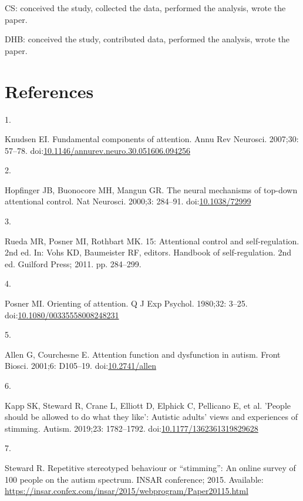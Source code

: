 \documentclass[
  letterpaper,
  DIV=11,
  numbers=noendperiod]{scrartcl}
\newlength{\cslhangindent}
\newlength{\csllabelwidth}
\newenvironment{CSLReferences}[2] %
 {\begin{list}{}{%
  \setlength{\itemindent}{0pt}
  \setlength{\leftmargin}{0pt}
  \setlength{\parsep}{0pt}
  \ifodd #1
   \setlength{\leftmargin}{\cslhangindent}
   \setlength{\itemindent}{-1\cslhangindent}
  \fi
  \setlength{\itemsep}{#2\baselineskip}}}
 {\end{list}}
\newcommand{\CSLLeftMargin}[1]{\parbox[t]{\csllabelwidth}{\strut#1\strut}}
\newcommand{\CSLRightInline}[1]{\parbox[t]{\linewidth - \csllabelwidth}{\strut#1\strut}}
\begin{document}
CS: conceived the study, collected the data, performed the analysis,
wrote the paper.

DHB: conceived the study, contributed data, performed the analysis,
wrote the paper.

\section*{References}\label{references}

\label{refs}
\begin{CSLReferences}{0}{1}
\CSLLeftMargin{1. }%
\CSLRightInline{Knudsen EI. Fundamental components of attention. Annu
Rev Neurosci. 2007;30: 57--78.
doi:\href{https://doi.org/10.1146/annurev.neuro.30.051606.094256}{10.1146/annurev.neuro.30.051606.094256}}

\CSLLeftMargin{2. }%
\CSLRightInline{Hopfinger JB, Buonocore MH, Mangun GR. The neural
mechanisms of top-down attentional control. Nat Neurosci. 2000;3:
284--91. doi:\href{https://doi.org/10.1038/72999}{10.1038/72999}}

\CSLLeftMargin{3. }%
\CSLRightInline{Rueda MR, Posner MI, Rothbart MK. 15: Attentional
control and self-regulation. 2nd ed. In: Vohs KD, Baumeister RF,
editors. Handbook of self-regulation. 2nd ed. Guilford Press; 2011. pp.
284--299. }

\CSLLeftMargin{4. }%
\CSLRightInline{Posner MI. Orienting of attention. Q J Exp Psychol.
1980;32: 3--25.
doi:\href{https://doi.org/10.1080/00335558008248231}{10.1080/00335558008248231}}

\CSLLeftMargin{5. }%
\CSLRightInline{Allen G, Courchesne E. Attention function and
dysfunction in autism. Front Biosci. 2001;6: D105--19.
doi:\href{https://doi.org/10.2741/allen}{10.2741/allen}}

\CSLLeftMargin{6. }%
\CSLRightInline{Kapp SK, Steward R, Crane L, Elliott D, Elphick C,
Pellicano E, et al. 'People should be allowed to do what they like':
Autistic adults' views and experiences of stimming. Autism. 2019;23:
1782--1792.
doi:\href{https://doi.org/10.1177/1362361319829628}{10.1177/1362361319829628}}

\CSLLeftMargin{7. }%
\CSLRightInline{Steward R. Repetitive stereotyped behaviour or
{``stimming''}: An online survey of 100 people on the autism spectrum.
INSAR conference; 2015. Available:
\url{https://insar.confex.com/insar/2015/webprogram/Paper20115.html}}


\end{CSLReferences}
\end{document}
